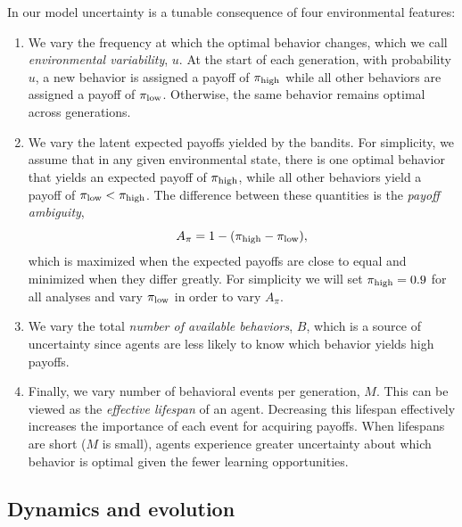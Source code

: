 \documentclass[letterpaper,11.5pt]{scrartcl}
\begin{document}
In our model uncertainty is a tunable consequence of four environmental features:
\begin{enumerate}
    \item We vary the frequency at which the optimal behavior changes, which we call \emph{environmental variability}, $u$. At the start of each generation, with probability $u$, a new behavior is assigned a payoff of $\pi_{\mathrm{high}}$ while all other behaviors are assigned a payoff of $\pi_{\mathrm{low}}$. Otherwise, the same behavior remains optimal across generations. 
    \item We vary the latent expected payoffs yielded by the bandits. For simplicity,
      we assume that in any given environmental state, there is one optimal behavior that
      yields an expected payoff of $\pi_{\mathrm{high}}$, while all other behaviors yield a 
      payoff of $\pi_{\mathrm{low}} < \pi_{\mathrm{high}}$. 
      The difference between these quantities is the \emph{payoff ambiguity}, 
    \begin{equation}
      A_\pi = 1 - (\pi_{\mathrm{high}} - \pi_{\mathrm{low}}),
      \label{eq:payoffAmbiguity}
    \end{equation}
    which is maximized when the expected payoffs are close to equal and minimized
    when they differ greatly. For simplicity we will set $\pi_{\mathrm{high}} = 0.9$
    for all analyses and vary $\pi_{\mathrm{low}}$ in order to vary $A_\pi$.
    \item We vary the total \emph{number of available behaviors}, $B$, which is a
      source of uncertainty since agents are less likely to know which behavior yields high payoffs.  %
    \item Finally, we vary number of behavioral events per generation, $M$. This can be viewed as the \emph{effective lifespan} of an agent.  Decreasing this lifespan effectively increases the importance of each event for acquiring payoffs. When lifespans are short ($M$ is small), agents experience greater uncertainty about which behavior is optimal given the fewer learning opportunities.
\end{enumerate}


\subsection{Dynamics and evolution}
\end{document}

